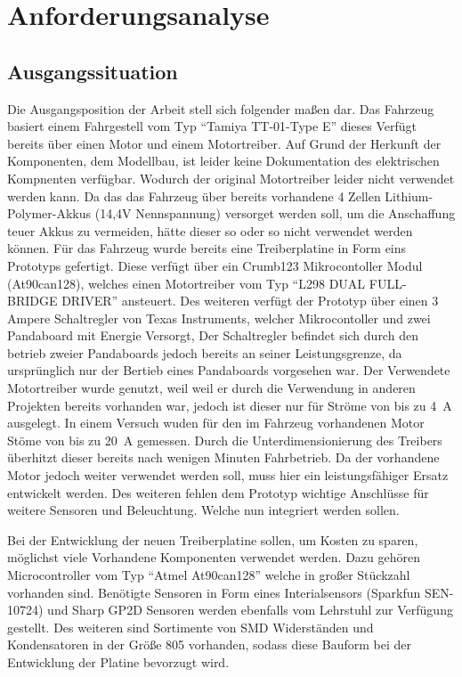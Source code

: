 
\chapter{Anforderungsanalyse}

\section{Ausgangssituation}
Die Ausgangsposition der Arbeit stell sich folgender maßen dar. Das Fahrzeug basiert einem Fahrgestell vom Typ ``Tamiya TT-01-Type E''
dieses Verfügt bereits über einen Motor und einem Motortreiber. Auf Grund der Herkunft der Komponenten, dem Modellbau, ist leider keine
Dokumentation des elektrischen Kompnenten verfügbar. Wodurch der original Motortreiber leider nicht verwendet werden kann.
Da das das Fahrzeug über bereits vorhandene 4 Zellen Lithium-Polymer-Akkus (14,4V Nennspannung) versorget werden soll, um die Anschaffung teuer Akkus zu vermeiden,
hätte dieser so oder so nicht verwendet werden können. Für das Fahrzeug wurde bereits eine Treiberplatine in Form eins Prototyps gefertigt.
Diese verfügt über ein Crumb123 Mikrocontoller Modul (At90can128), welches einen Motortreiber vom Typ ``L298 DUAL FULL-BRIDGE DRIVER'' ansteuert.
Des weiteren verfügt der Prototyp über einen 3 Ampere Schaltregler von Texas Instruments, welcher Mikrocontoller und zwei Pandaboard mit Energie Versorgt, 
Der Schaltregler befindet sich durch den betrieb zweier Pandaboards jedoch bereits an seiner Leistungsgrenze, da ursprünglich nur der Bertieb eines Pandaboards
vorgesehen war. Der Verwendete Motortreiber wurde genutzt, weil weil er durch die Verwendung in anderen Projekten bereits vorhanden war, jedoch ist dieser 
nur für Ströme von bis zu \SI{4}{\A} ausgelegt. In einem Versuch wuden für den im Fahrzeug vorhandenen Motor Stöme von bis zu \SI{20}{\A} gemessen. 
Durch die Unterdimensionierung des Treibers überhitzt dieser bereits nach wenigen Minuten Fahrbetrieb.
Da der vorhandene Motor jedoch weiter verwendet werden soll, muss hier ein leistungsfähiger Ersatz 
entwickelt werden. Des weiteren fehlen dem Prototyp wichtige Anschlüsse für weitere Sensoren und Beleuchtung. Welche nun integriert werden sollen. 

Bei der Entwicklung der neuen Treiberplatine sollen, um Kosten zu sparen, möglichst viele Vorhandene Komponenten verwendet werden. Dazu gehören
Microcontroller vom Typ ``Atmel At90can128'' welche in großer Stückzahl vorhanden sind. Benötigte Sensoren in Form eines Interialsensors (Sparkfun SEN-10724)
und Sharp GP2D Sensoren werden ebenfalls vom Lehrstuhl zur Verfügung gestellt. Des weiteren sind Sortimente von SMD Widerständen und
Kondensatoren in der Größe 805 vorhanden, sodass diese Bauform bei der Entwicklung der Platine bevorzugt wird.


